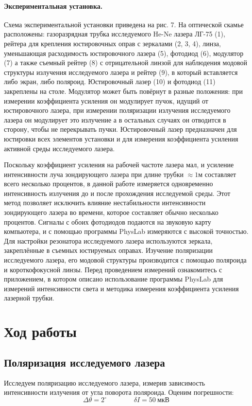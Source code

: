 \documentclass[a4paper,12pt]{article}
\theoremstyle{definition}
\begin{document}
\paragraph{Экспериментальная установка.} Схема экспериментальной установки приведена на рис. 7. 
На оптической скамье расположены: газоразрядная трубка исследуемого He-Ne лазера ЛГ-75 (1), 
рейтера для крепления юстировочных оправ с зеркалами (2, 3, 4), линза, уменьшающая расходимость 
юстировочного лазера (5), фотодиод (6), модулятор (7) а также съемный рейтер (8) с отрицательной 
линзой для наблюдения модовой структуры излучения исследуемого лазера и рейтер (9), в который 
вставляется либо экран, либо поляроид. Юстировочный лазер (10) и фотодиод (11) закреплены на 
столе. Модулятор может быть повёрнут в разные положения: при измерении коэффициента усиления он 
модулирует пучок, идущий от юстировочного лазера, при измерении поляризации излучения 
исследуемого лазера он модулирует это излучение а в остальных случаях он отводится в сторону, 
чтобы не перекрывать пучки. Юстировочный лазер предназначен для юстировки всех элементов установки
и для измерения коэффициента усиления активной среды исследуемого лазера. 
\par Поскольку коэффициент усиления на рабочей частоте лазера мал, и усиление интенсивности луча 
зондирующего лазера при длине трубки $\approx 1$м составляет всего несколько процентов,
в данной работе измеряется одновременно интенсивность излучения до и после
прохождения исследуемой среды. Этот метод позволяет исключить влияние
нестабильности интенсивности зондирующего лазера во времени, которое составляет
обычно несколько процентов. Сигналы с обоих фотодиодов подаются на звуковую
карту компьютера, и с помощью программы PhysLab измеряются с высокой точностью.
Для настройки резонатора исследуемого лазера используются зеркала, закреплённые
в съемных юстируемых оправах. Изучение поляризации исследуемого лазера, его
модовой структуры производится с помощью поляроида и короткофокусной линзы.
Перед проведением измерений ознакомитесь с приложением, в котором описано
использование программы PhysLab для измерений интенсивности света и методика
измерения коэффициента усиления лазерной трубки.

\section{Ход работы}

\subsection{Поляризация исследуемого лазера}
\par Исследуем поляризацию исследуемого лазера, измерив зависимость интенсивности излучения от угла поворота поляроида.
Оценим погрешности:
$$\Delta \theta=2^{\circ} \qquad \qquad \delta I = 50~\text{мкВ}$$
\end{document}
